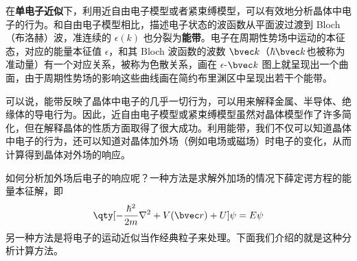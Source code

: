 
在\textbf{单电子近似}下，利用近自由电子模型或者紧束缚模型，可以有效地分析晶体中电子的行为。和自由电子模型相比，描述电子状态的波函数从平面波过渡到 Bloch （布洛赫）波，准连续的 $\epsilon(k)$ 也分裂为\textbf{能带}。电子在周期性势场中运动的本征态，对应的能量本征值 $\epsilon$，和其 Bloch 波函数的波数 $\bvec k$（$\hbar \bvec k$也被称为准动量）有一个对应关系，被称为色散关系，画在 $\epsilon$-${\bvec k}$ 图上就呈现出一个曲面，由于周期性势场的影响这些曲线画在简约布里渊区中呈现出若干个能带。

可以说，能带反映了晶体中电子的几乎一切行为，可以用来解释金属、半导体、绝缘体的导电行为。因此，近自由电子模型或紧束缚模型虽然对晶体模型作了许多简化，但在解释晶体的性质方面取得了很大成功。利用能带，我们不仅可以知道晶体中电子的行为，还可以知道对晶体加外场（例如电场或磁场）时电子的变化，从而计算得到晶体对外场的响应。

如何分析加外场后电子的响应呢？一种方法是求解外加场的情况下薛定谔方程的能量本征解，即
\begin{equation}
\qty[-\frac{\hbar^2}{2m}\nabla^2+V(\bvec r)+U]\psi = E\psi
\end{equation}
另一种方法是将电子的运动近似当作经典粒子来处理。下面我们介绍的就是这种分析计算方法。
